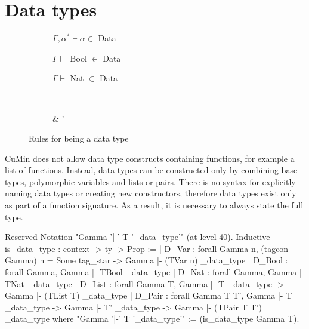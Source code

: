 \documentclass[fleqn]{scrreprt}
\begin{document}
\section{Data types}
\begin{figure}[H]
	\begin{center}
		\begin{subfigure}{.25 \linewidth}
			\centering
			$\Gamma, \alpha^{*} \vdash \alpha \in$ Data
		\end{subfigure}
		\begin{subfigure}{.25 \linewidth}
			\centering
			$\Gamma \vdash$ Bool $\in$ Data
		\end{subfigure}
		\begin{subfigure}{.25 \linewidth}
			\centering
			$\Gamma \vdash$ Nat $\in$ Data
		\end{subfigure}\\
		\vspace{1em}
		\begin{subfigure}{.375 \linewidth}
			\centering
			      {\Gamma \vdash \tau \in {}}
		\end{subfigure}
		\hspace{.1 \linewidth}
		\begin{subfigure}{.375 \linewidth}
			\centering
			      {\Gamma \vdash \tau \in {} & \Gamma \vdash \tau' \in {}}
		\end{subfigure}
	\end{center}
	\caption{Rules for being a data type}
\end{figure}
CuMin does not allow data type constructs containing functions, for example a list of functions. Instead, data types can be constructed only by combining base types, polymorphic variables and lists or pairs. There is no syntax for explicitly naming data types or creating new constructors, therefore data types exist only as part of a function signature. As a result, it is necessary to always state the full type.
\begin{coqcode}
Reserved Notation "Gamma '|-' T '\is_data_type'" (at level 40).
Inductive is_data_type : context -> ty -> Prop :=
  | D_Var  : forall Gamma n,
               (tagcon Gamma) n  = Some tag_star ->
               Gamma |- (TVar n) \is_data_type
  | D_Bool : forall Gamma, Gamma |- TBool \is_data_type
  | D_Nat  : forall Gamma, Gamma |- TNat \is_data_type
  | D_List : forall Gamma T,
               Gamma |- T \is_data_type ->
               Gamma |- (TList T) \is_data_type
  | D_Pair : forall Gamma T T', 
               Gamma |- T \is_data_type ->
               Gamma |- T' \is_data_type ->
               Gamma |- (TPair T T') \is_data_type
where "Gamma '|-' T '\is_data_type'" := (is_data_type Gamma T).
\end{coqcode}
\end{document}
